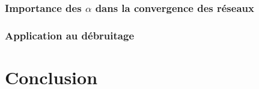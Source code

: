 \documentclass[12pt, twoside, letterpaper, french]{article}
\begin{document}
\subsubsection{Importance des $\alpha$ dans la convergence des réseaux}
\vspace{0.2cm}


\subsubsection{Application au débruitage}
\vspace{0.3cm}

\newpage


\section{Conclusion}
\vspace{0.2cm}

\newpage



\thispagestyle{empty}
{}

\thispagestyle{empty}

\end{document}
